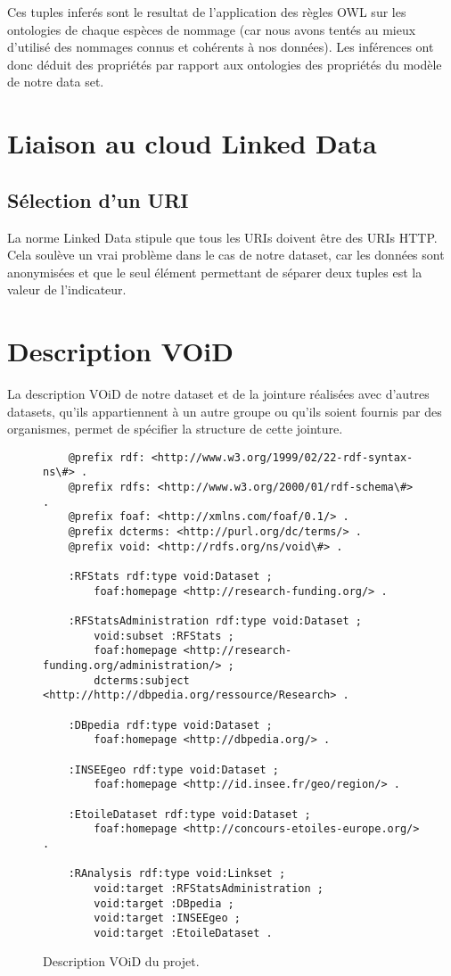 Ces tuples inferés sont le resultat de l'application des règles OWL sur les ontologies de chaque espèces de nommage (car nous avons tentés au mieux d'utilisé des nommages connus et cohérents à nos données).
Les inférences ont donc déduit des propriétés par rapport aux ontologies des propriétés du modèle de notre data set.

\chapter{Liaison au cloud Linked Data}
\section{Sélection d'un URI}

La norme Linked Data stipule que tous les URIs doivent être des URIs HTTP. Cela soulève un vrai problème dans le cas de notre dataset, car les données sont anonymisées et que le seul élément permettant de séparer deux tuples est la valeur de l'indicateur.

\chapter{Description VOiD}

La description VOiD de notre dataset et de la jointure réalisées avec d'autres datasets, qu'ils appartiennent à un autre groupe ou qu'ils soient fournis par des organismes, permet de spécifier la structure de cette jointure.

\begin{figure}[H]
\begin{lstlisting}
    @prefix rdf: <http://www.w3.org/1999/02/22-rdf-syntax-ns\#> .
    @prefix rdfs: <http://www.w3.org/2000/01/rdf-schema\#> .
    @prefix foaf: <http://xmlns.com/foaf/0.1/> .
    @prefix dcterms: <http://purl.org/dc/terms/> .
    @prefix void: <http://rdfs.org/ns/void\#> .
    
    :RFStats rdf:type void:Dataset ;
        foaf:homepage <http://research-funding.org/> .
    
    :RFStatsAdministration rdf:type void:Dataset ;
        void:subset :RFStats ;
        foaf:homepage <http://research-funding.org/administration/> ;
        dcterms:subject <http://http://dbpedia.org/ressource/Research> .
    
    :DBpedia rdf:type void:Dataset ;
        foaf:homepage <http://dbpedia.org/> .
    
    :INSEEgeo rdf:type void:Dataset ;
        foaf:homepage <http://id.insee.fr/geo/region/> .
    
    :EtoileDataset rdf:type void:Dataset ;
        foaf:homepage <http://concours-etoiles-europe.org/> .
    
    :RAnalysis rdf:type void:Linkset ;
        void:target :RFStatsAdministration ;
        void:target :DBpedia ;
        void:target :INSEEgeo ;
        void:target :EtoileDataset .
\end{lstlisting}
\caption{Description VOiD du projet.}
\end{figure}
